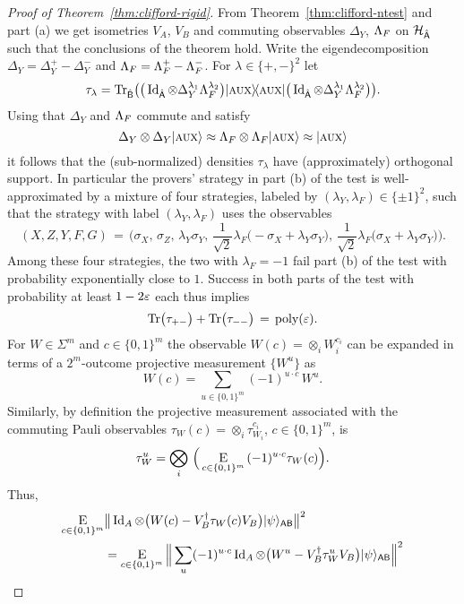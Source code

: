\begin{proof}[Proof of Theorem~\ref{thm:clifford-rigid}]
From Theorem~\ref{thm:clifford-ntest} and part (a) we get isometries $V_A$, $V_B$ and commuting observables $\Delta_Y$, $\Lambda_F$ on ${\mathcal{H}}_{\hat{{\textsf{A}}}}$ such that the conclusions of the theorem hold. Write the eigendecomposition $\Delta_Y = \Delta_Y^{+}-\Delta_Y^{-}$ and $\Lambda_F = \Lambda_F^{+}-\Lambda_F^{-}$. For $\lambda \in \{+,-\}^2$ let
$$\tau_{\lambda} = \mbox{\rm Tr}_{\hat{{\textsf{B}}}}\big( \big(\mathop{\rm Id}\nolimits_{\hat{{\textsf{A}}}}\otimes \Delta_Y^{\lambda_1}\Lambda_F^{\lambda_2} \big)|\textsc {aux}\rangle\!\langle\textsc {aux}|\big(\mathop{\rm Id}\nolimits_{\hat{{\textsf{A}}}}\otimes \Delta_Y^{\lambda_1}\Lambda_F^{\lambda_2}\big)\big).$$ 
Using that $\Delta_Y$ and $\Lambda_F$ commute and satisfy 
$$\Delta_Y \otimes \Delta_Y |\textsc {aux}\rangle \approx \Lambda_F\otimes \Lambda_F |\textsc {aux}\rangle \approx |\textsc {aux}\rangle$$
 it follows that the (sub-normalized) densities $\tau_{\lambda}$ have (approximately) orthogonal support. In particular the provers' strategy in part (b) of the test is well-approximated by a mixture of four strategies, labeled by $(\lambda_Y,\lambda_F)\in\{\pm 1\}^2$, such that the strategy with label $(\lambda_Y,\lambda_F)$ uses the observables 
$$(X,Z,Y,F,G)\,=\,\Big(\sigma_X,\,\sigma_Z,\,\lambda_Y\sigma_Y,\,\frac{1}{\sqrt{2}}\lambda_F\big(-\sigma_X + \lambda_Y\sigma_Y\big),\,\frac{1}{\sqrt{2}}\lambda_F\big(\sigma_X + \lambda_Y\sigma_Y\big)\Big).$$ 
Among these four strategies, the two with $\lambda_F=-1$ fail part (b) of the test with probability exponentially close to $1$. Success in both parts of the test with probability at least $1-2\varepsilon$ each thus implies
\begin{equation}\label{eq:tau-bound}
\mbox{\rm Tr}\big(\tau_{+-}\big)+\mbox{\rm Tr}\big(\tau_{--}\big) \,=\, \operatorname{poly}(\varepsilon).
\end{equation} 
For $W\in \Sigma^{m}$ and $c\in \{0,1\}^m$ the observable $W(c) = \otimes_i W_{i}^{c_i}$ can be expanded in terms of a $2^m$-outcome projective measurement $\{W^{u}\}$ as 
$$W(c) = \sum_{u\in \{0,1\}^m}  (-1)^{u\cdot c} \,W^{u}.$$
Similarly, by definition the projective measurement associated with the commuting Pauli observables $\tau_W(c) = \otimes_i \tau_{W_{i}}^{c_i}$, $c\in\{0,1\}^m$, is 
$$\tau_W^{u} = \bigotimes_i \,\Big(\mathop{\textsc{E}}_{c\in \{0,1\}^m} \,(-1)^{u \cdot c} \tau_W(c)\Big).$$ 
Thus,
\begin{align}
\Es{c\in\{0,1\}^m} & \big\| \Id_A \otimes \big(  W(c) - V_B^\dagger \tau_{W}(c) V_B\big)   \ket{\psi}_{\reg{AB}} \big\|^2\notag\\
&= \Es{c\in\{0,1\}^m}\Big\| \sum_{u} (-1)^{u\cdot c} \Id_A \otimes \big(  W^{u} - V_B^\dagger\tau_{W}^{u} V_B\big)   \ket{\psi}_{\reg{AB}} \Big\|^2    \notag\\

\end{align}
\end{proof}
